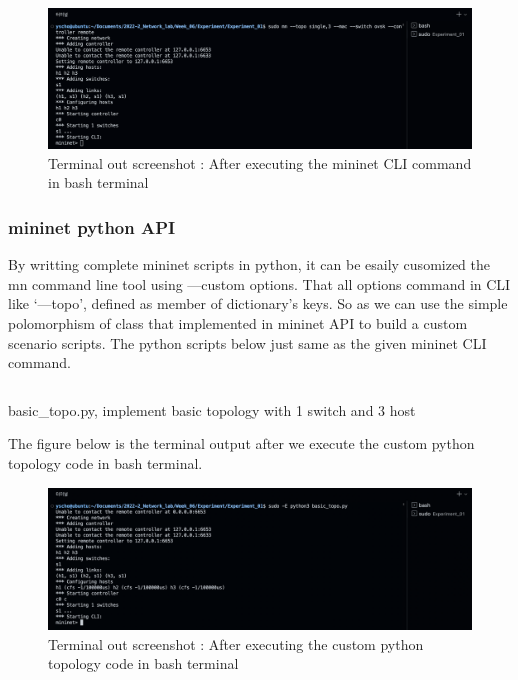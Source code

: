 \vspace{-4mm}
\begin{figure}[!h]\centering 
	\includegraphics[width=.9\textwidth]{image/week06/1-3-1.png}
	\caption{\footnotesize 
	Terminal out screenshot : After executing the mininet CLI command in bash terminal}
	\vspace{-10pt}
\end{figure}
\vspace{-4mm}
\subsubsection*{mininet python API}
By writting complete mininet scripts in python, it can be esaily cusomized the mn command line tool using —custom options. That all options command in CLI like ‘—topo’, defined as member of dictionary’s keys. 
So as we can use the simple polomorphism of class that implemented in mininet API to build a custom scenario scripts.
The python scripts below just same as the given mininet CLI command.
\begin{listing}[h!]
\inputminted[framerule = 1pt,framesep = 2mm , frame = lines, fontsize=\scriptsize]{python}{./code/week06/basic_topo.py}
\caption{\footnotesize basic\_topo.py, implement basic topology with 1 switch and 3 host }
\end{listing}
\clearpage
The figure below is the terminal output after we execute the custom python topology code in bash terminal.\\
\vspace{-4mm}
\begin{figure}[!h]\centering 
	\includegraphics[width=.9\textwidth]{image/week06/1-3-2.png}
	\caption{
	Terminal out screenshot : After executing the custom python topology code in bash terminal}
	\vspace{-10pt}
\end{figure}

